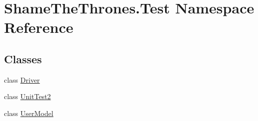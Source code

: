 \hypertarget{namespace_shame_the_thrones_1_1_test}{}\section{Shame\+The\+Thrones.\+Test Namespace Reference}
\label{namespace_shame_the_thrones_1_1_test}
\subsection*{Classes}
\begin{DoxyCompactItemize}
\item 
class \hyperlink{class_shame_the_thrones_1_1_test_1_1_driver}{Driver}
\item 
class \hyperlink{class_shame_the_thrones_1_1_test_1_1_unit_test2}{Unit\+Test2}
\item 
class \hyperlink{class_shame_the_thrones_1_1_test_1_1_user_model}{User\+Model}
\end{DoxyCompactItemize}
